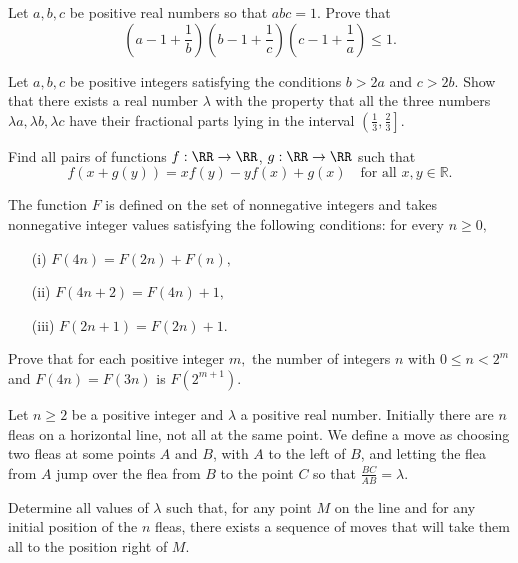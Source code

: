 \item[\textbf{A1.}]Let $ a, b, c$ be positive real numbers so that $ abc = 1$. Prove that\[ \left( a - 1 + \frac 1b \right) \left( b - 1 + \frac 1c \right) \left( c - 1 + \frac 1a \right) \leq 1.\]

\item[\textbf{A2.}]Let $ a, b, c$ be positive integers satisfying the conditions $ b > 2a$ and $ c > 2b.$ Show that there exists a real number $ \lambda$ with the property that all the three numbers $ \lambda a, \lambda b, \lambda c$ have their fractional parts lying in the interval $ \left(\frac {1}{3}, \frac {2}{3} \right].$

\item[\textbf{A3.}]Find all pairs of functions $ f : \mathbb \RR \to \mathbb \RR$,  $g : \mathbb \RR \to \mathbb \RR$ such that \[f \left( x + g(y) \right) = xf(y) - y  f(x) + g(x) \quad\text{for all } x, y\in\mathbb{R}.\]

\item[\textbf{A4.}]The function $ F$ is defined on the set of nonnegative integers and takes nonnegative integer values satisfying the following conditions: for every $ n \geq 0,$

\begin{itemize}
\item[(i)] $ F(4n) = F(2n) + F(n),$

\item[(ii)] $ F(4n + 2) = F(4n) + 1,$

\item[(iii)] $ F(2n + 1) = F(2n) + 1.$
\end{itemize}

Prove that for each positive integer $ m,$ the number of integers $ n$ with $ 0 \leq n < 2^m$ and $ F(4n) = F(3n)$ is $ F(2^{m + 1}).$

\item[\textbf{A5.}]Let $ n \geq 2$ be a positive integer and $ \lambda$ a positive real number. Initially there are $ n$ fleas on a horizontal line, not all at the same point. We define a move as choosing two fleas at some points $ A$ and $ B$,  with $ A$ to the left of $ B$,  and letting the flea from $ A$ jump over the flea from $ B$ to the point $ C$ so that $ \frac {BC}{AB} = \lambda$.

Determine all values of $ \lambda$ such that, for any point $ M$ on the line and for any initial position of the $ n$ fleas, there exists a sequence of moves that will take them all to the position right of $ M$.

